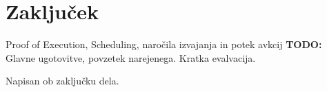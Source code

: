 \documentclass[a4paper, 12pt]{book}
\begin{document}
\chapter{Zaključek}
\label{stroka}

Proof of Execution, Scheduling, naročila izvajanja in potek avkcij
\textbf{TODO:} Glavne ugotovitve, povzetek narejenega. Kratka evalvacija.

Napisan ob zaključku dela.


\newpage %
\ \\
\clearpage
{}


\end{document}
